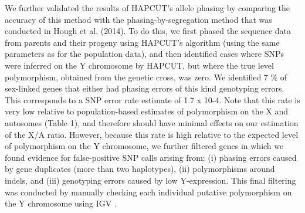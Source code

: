 \documentclass[9pt,twocolumn,twoside]{gsajnl}
\begin{document}
We further validated the results of HAPCUT’s allele phasing by comparing the accuracy of this method with the phasing-by-segregation method that was conducted in Hough et al. (2014). To do this, we first phased the sequence data from parents and their progeny using HAPCUT’s algorithm (using the same parameters as for the population data), and then identified cases where SNPs were inferred on the Y chromosome by HAPCUT, but where the true level polymorphism, obtained from the genetic cross, was zero. We identified 7 \% of sex-linked genes that either had  phasing errors of this kind genotyping errors. This corresponds to a SNP error rate estimate of 1.7 x 10-4. Note that this rate is very low relative to population-based estimates of polymorphism on the X and autosomes (Table 1), and therefore should have minimal effects on our estimation of the X/A ratio. However, because this rate is high relative to the expected level of polymorphism on the Y chromosome, we further filtered genes in which we found evidence for false-positive SNP calls arising from: (i) phasing errors caused by gene duplicates (more than two haplotypes), (ii) polymorphisms around indels, and (iii) genotyping errors caused by low Y-expression. This final filtering was conducted by manually checking each individual putative polymorphism on the Y chromosome using IGV \citep{robinson2011integrative}.
\end{document}
